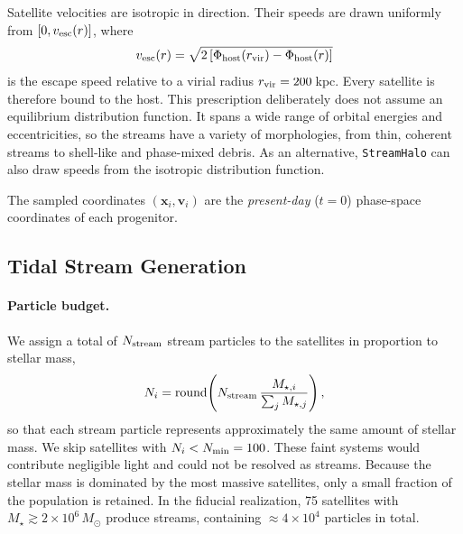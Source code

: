 Satellite velocities are isotropic in direction. Their speeds are drawn uniformly from
$[0, v_{\rm esc}(r)]$, where
\begin{equation}
    v_{\rm esc}(r) = \sqrt{2\left[\Phi_{\rm host}(r_{\rm vir}) - \Phi_{\rm host}(r)\right]}
\end{equation}
is the escape speed relative to a virial radius $r_{\rm vir} = 200$\,kpc. Every satellite is
therefore bound to the host. This prescription deliberately does not assume an equilibrium
distribution function. It spans a wide range of orbital energies and eccentricities, so the
streams have a variety of morphologies, from thin, coherent streams to shell-like and
phase-mixed debris. As an alternative, \texttt{StreamHalo} can also draw speeds from the
isotropic \citet{Hernquist1990} distribution function.

The sampled coordinates $(\mathbf{x}_i, \mathbf{v}_i)$ are the \emph{present-day}
($t = 0$) phase-space coordinates of each progenitor.

\subsection{Tidal Stream Generation} \label{sec:mock_streams}

\paragraph{Particle budget.}
We assign a total of $N_{\rm stream}$ stream particles to the satellites in proportion to
stellar mass,
\begin{equation}
    N_i = \mathrm{round}\!\left(N_{\rm stream}\,
          \frac{M_{\star,i}}{\sum_j M_{\star,j}}\right),
\end{equation}
so that each stream particle represents approximately the same amount of stellar mass. We
skip satellites with $N_i < N_{\rm min} = 100$. These faint systems would contribute
negligible light and could not be resolved as streams. Because the stellar mass is dominated
by the most massive satellites, only a small fraction of the population is retained. In the
fiducial realization, 75 satellites with $M_\star \gtrsim 2\times10^{6}\,M_\odot$ produce
streams, containing $\approx 4\times10^{4}$ particles in total.

